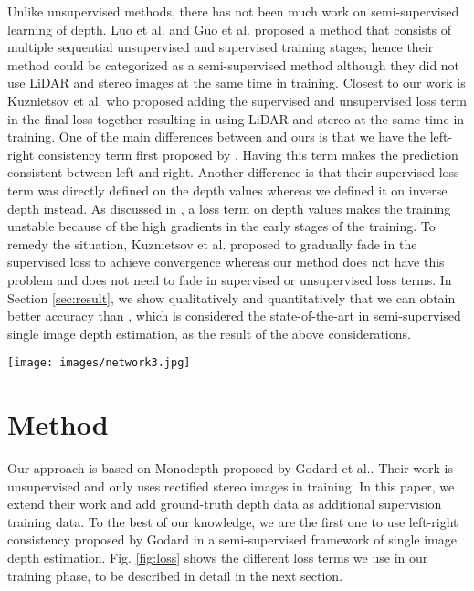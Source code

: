 \documentclass[letterpaper, 10 pt, conference]{ieeeconf}
\begin{document}
Unlike unsupervised methods, there has not been much work on semi-supervised learning of depth. Luo et al. \cite{luo2018single} and Guo et al.\cite{Guo_2018_ECCV} proposed a method that consists of multiple sequential unsupervised and supervised training stages; hence their method could be categorized as a semi-supervised method although they did not use LiDAR and stereo images at the same time in training.
Closest to our work is Kuznietsov et al. \cite{kuznietsov2017semi} who proposed adding the supervised and unsupervised loss term in the final loss together resulting in using LiDAR and stereo at the same time in training. One of the main differences between\cite{kuznietsov2017semi} and ours is that we have the left-right consistency term first proposed by \cite{godard2017unsupervised}. Having this term makes the prediction consistent between left and right. Another difference is that their supervised loss term was directly defined on the depth values whereas we defined it on inverse depth instead. As discussed in \cite{kuznietsov2017semi}, a loss term on depth values makes the training unstable because of the high gradients in the early stages of the training. To remedy the situation, Kuznietsov et al. proposed to gradually fade in the supervised loss to achieve convergence whereas our method does not have this problem and does not need to fade in supervised or unsupervised loss terms. In Section \ref{sec:result}, we show qualitatively and quantitatively that we can obtain better accuracy than \cite{kuznietsov2017semi}, which is considered the state-of-the-art in semi-supervised single image depth estimation, as the result of the above considerations. 
 
 \begin{figure*} [!h]
        \centering
        \texttt{[image: images/network3.jpg]}
        \caption{Overview of the schematic of our proposed loss. There are 4 terms in our loss $E_{reconstruction}$, $E_{supervised}$, $E_{lr}$, $E_{smooth}$, $E_{supervised}$. Subscript $L$ and $R$ refers to left and right image, respectively. $\rho$ refers to output of our network inverse depth. We use bilinear sampler in the inverse warping function.}
        \label{fig:loss}
    \end{figure*}
      
      

\section{Method}
 Our approach is based on Monodepth proposed by Godard et al.\cite{godard2017unsupervised}. Their work is unsupervised and only uses rectified stereo images in training. In this paper, we extend their work and add ground-truth depth data as additional supervision training data. To the best of our knowledge, we are the first one to use left-right consistency proposed by Godard \cite{godard2017unsupervised} in a semi-supervised framework of single image depth estimation. Fig. \ref{fig:loss} shows the different loss terms we use in our training phase, to be described in detail in the next section. 
\end{document}
